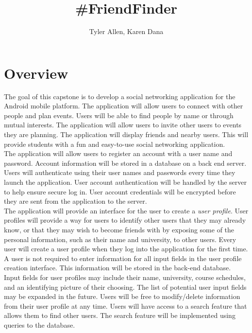 \documentclass[11pt]{article}
\begin{document}
\title{\#FriendFinder}
\author{Tyler Allen, Karen Dana}
\maketitle

\section{Overview}


The goal of this capstone is to develop a social networking application for 
the Android mobile platform. The application will allow users to connect with other people and 
plan events. Users will be able to find people by name or through mutual interests. The application
will allow users to invite other users to events they are planning. The application will display 
friends and nearby users. This will provide students with a fun and easy-to-use social networking
application.\\


The application will allow users to register an account with a user name and password. 
Account information will be stored in a database on a back end server. Users will authenticate 
using their user names and passwords every time they launch the application. User account 
authentication will be handled by the server to help ensure secure log in. User account 
credentials will be encrypted before they are sent from the application to the
server. \\


The application will provide an interface for the user to create a 
\textit{user profile}. User profiles will provide a way for users to identify other users 
that they may already know, or that they may wish to become friends with by exposing some of the 
personal information, such as their name and university, to other users. Every user will create a 
user profile when they log into the application for the first time. A user is not required to 
enter information for all input fields in the user profile creation interface. This information will 
be stored in the back-end database. Input fields for user profiles may include
their name, university, course schedules, and an identifying picture of their choosing. The list of 
potential user input fields may be expanded in the future. Users will 
be free to modify/delete information from their user profile at any time. Users will have access
to a search feature that allows them to find other users. The search feature will be implemented using queries
to the database. \\
\end{document}
